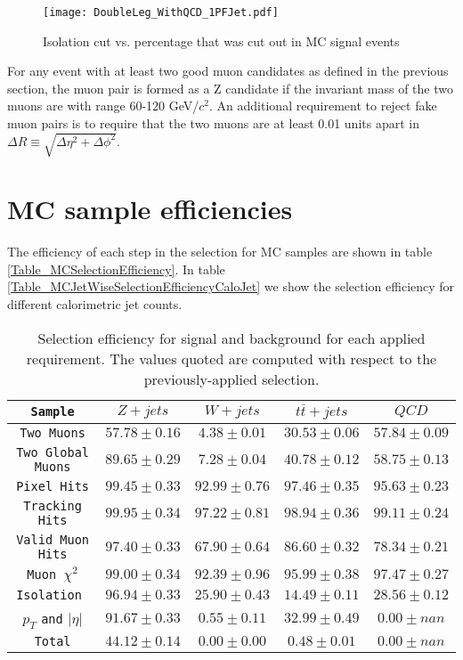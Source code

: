 \documentclass[10pt,a4paper,onecolumn]{article}
\begin{document}
\begin{figure}
\texttt{[image: DoubleLeg\_WithQCD\_1PFJet.pdf]}
\caption{Isolation cut vs. percentage that was cut out in MC signal events}
\label{Figure_IsolationCutVsRejectionPercentage}
\end{figure}

For any event with at least two good muon candidates as defined in the previous section, the muon pair is formed as a Z candidate if
the invariant mass of the two muons are with range 60-120 GeV/$c^2$.  An additional requirement to reject fake muon pairs is to require
that the two muons are at least 0.01 units apart in $\Delta R \equiv \sqrt{\Delta\eta^2 + \Delta\phi^2}$.

\section{MC sample efficiencies}

The efficiency of each step in the selection for MC samples are shown in table \ref{Table_MCSelectionEfficiency}.
In table \ref{Table_MCJetWiseSelectionEfficiencyCaloJet} we show the selection efficiency for different calorimetric jet counts.

\begin{table}[htdp]
 \caption{Selection efficiency for signal and background for each
    applied requirement. The values quoted are computed with respect
    to the previously-applied selection.\label{tab:effSel}}
 \centering
 \begin{tabular}{|c|c|c|c|c|}
   \hline
   \verb|Sample| & $Z+jets$ & $W+jets$ & $t \bar t+jets$ & $QCD$ \\
   \hline
   \verb|Two Muons|          & $ 57.78 \pm 0.16 $ & $ 4.38 \pm 0.01 $ & $ 30.53 \pm 0.06 $ & $ 57.84 \pm 0.09 $ \\
   \verb|Two Global Muons|   & $ 89.65 \pm 0.29 $ & $ 7.28 \pm 0.04 $ & $ 40.78 \pm 0.12 $ & $ 58.75 \pm 0.13 $ \\
   \verb|Pixel Hits|         & $ 99.45 \pm 0.33 $ & $ 92.99 \pm 0.76 $ & $ 97.46 \pm 0.35 $ & $ 95.63 \pm 0.23 $ \\
   \verb|Tracking Hits|      & $ 99.95 \pm 0.34 $ & $ 97.22 \pm 0.81$ & $ 98.94 \pm 0.36 $ & $ 99.11 \pm 0.24 $ \\
   \verb|Valid Muon Hits|    & $ 97.40 \pm 0.33 $ & $ 67.90 \pm 0.64 $ & $ 86.60 \pm 0.32 $ & $ 78.34 \pm 0.21 $ \\
   \verb|Muon |$\chi^2$      & $ 99.00 \pm 0.34 $ & $ 92.39 \pm 0.96 $ & $ 95.99 \pm 0.38 $ & $ 97.47 \pm 0.27 $ \\
   \verb|Isolation |         & $ 96.94 \pm 0.33 $ & $ 25.90 \pm 0.43$ & $ 14.49 \pm 0.11 $ & $ 28.56 \pm 0.12 $ \\
   $p_T$ \verb|and| $|\eta|$ & $ 91.67 \pm 0.33 $ & $ 0.55 \pm 0.11 $ & $ 32.99 \pm 0.49 $ & $ 0.00 \pm nan $ \\
   \hline
   \verb|Total|              & $ 44.12 \pm 0.14 $ & $ 0.00 \pm 0.00 $ & $ 0.48 \pm 0.01 $ & $ 0.00 \pm nan $ \\
   \hline
   \end{tabular}
\label{table}
\end{table}
\end{document}

